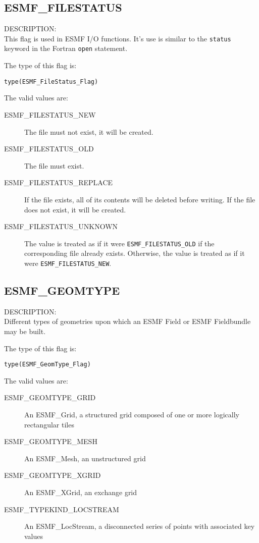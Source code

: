 \subsection{ESMF\_FILESTATUS}
\label{const:filestatusflag}
{\sf DESCRIPTION:\\}
This flag is used in ESMF I/O functions. It's use is similar to the
{\tt status} keyword in the Fortran {\tt open} statement.

The type of this flag is:

{\tt type(ESMF\_FileStatus\_Flag)}

The valid values are:
\begin{description}
\item [ESMF\_FILESTATUS\_NEW]
      The file must not exist, it will be created.
\item [ESMF\_FILESTATUS\_OLD]
      The file must exist.
\item [ESMF\_FILESTATUS\_REPLACE]
      If the file exists, all of its contents will be deleted before writing.
      If the file does not exist, it will be created.
\item [ESMF\_FILESTATUS\_UNKNOWN]
      The value is treated as if it were {\tt ESMF\_FILESTATUS\_OLD} if
      the corresponding file already exists. Otherwise, the value is
      treated as if it were {\tt ESMF\_FILESTATUS\_NEW}.

\end{description}

\subsection{ESMF\_GEOMTYPE}
\label{const:geomtype}

{\sf DESCRIPTION:\\}
Different types of geometries upon which an ESMF Field or ESMF Fieldbundle may
be built. 

The type of this flag is:

{\tt type(ESMF\_GeomType\_Flag)}

The valid values are:
\begin{description}
\item [ESMF\_GEOMTYPE\_GRID]
      An ESMF\_Grid, a structured grid composed of one or more logically rectangular tiles
\item [ESMF\_GEOMTYPE\_MESH]
      An ESMF\_Mesh, an unstructured grid
\item [ESMF\_GEOMTYPE\_XGRID]
      An ESMF\_XGrid, an exchange grid
\item [ESMF\_TYPEKIND\_LOCSTREAM]
      An ESMF\_LocStream, a disconnected series of points with associated key values
\end{description}

